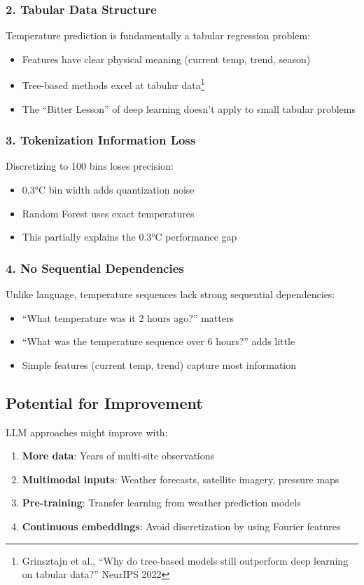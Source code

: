 \documentclass[11pt,letterpaper]{article}
\begin{document}
\subsubsection{2. Tabular Data Structure}
Temperature prediction is fundamentally a tabular regression problem:
\begin{itemize}
    \item Features have clear physical meaning (current temp, trend, season)
    \item Tree-based methods excel at tabular data\footnote{Grinsztajn et al., ``Why do tree-based models still outperform deep learning on tabular data?'' NeurIPS 2022}
    \item The ``Bitter Lesson'' of deep learning doesn't apply to small tabular problems
\end{itemize}

\subsubsection{3. Tokenization Information Loss}
Discretizing to 100 bins loses precision:
\begin{itemize}
    \item 0.3°C bin width adds quantization noise
    \item Random Forest uses exact temperatures
    \item This partially explains the 0.3°C performance gap
\end{itemize}

\subsubsection{4. No Sequential Dependencies}
Unlike language, temperature sequences lack strong sequential dependencies:
\begin{itemize}
    \item ``What temperature was it 2 hours ago?'' matters
    \item ``What was the temperature sequence over 6 hours?'' adds little
    \item Simple features (current temp, trend) capture most information
\end{itemize}

\subsection{Potential for Improvement}

LLM approaches might improve with:
\begin{enumerate}
    \item \textbf{More data}: Years of multi-site observations
    \item \textbf{Multimodal inputs}: Weather forecasts, satellite imagery, pressure maps
    \item \textbf{Pre-training}: Transfer learning from weather prediction models
    \item \textbf{Continuous embeddings}: Avoid discretization by using Fourier features
\end{enumerate}
\end{document}
